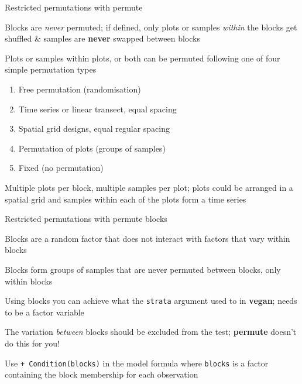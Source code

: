 \documentclass[10pt,ignorenonframetext,compress, aspectratio=169]{beamer}
\providecommand{\tightlist}{%
  \setlength{\itemsep}{0pt}\setlength{\parskip}{0pt}}
\begin{document}
\begin{frame}{Restricted permutations with permute}

Blocks are \emph{never} permuted; if defined, only plots or samples
\emph{within} the blocks get shuffled \& samples are \textbf{never}
swapped between blocks

Plots or samples within plots, or both can be permuted following one of
four simple permutation types

\begin{enumerate}
\def\labelenumi{\arabic{enumi}.}
\tightlist
\item
  Free permutation (randomisation)
\item
  Time series or linear transect, equal spacing
\item
  Spatial grid designs, equal regular spacing
\item
  Permutation of plots (groups of samples)
\item
  Fixed (no permutation)
\end{enumerate}

Multiple plots per block, multiple samples per plot; plots could be
arranged in a spatial grid and samples within each of the plots form a
time series

\end{frame}

\begin{frame}[fragile]{Restricted permutations with permute \textbar{}
blocks}

Blocks are a random factor that does not interact with factors that vary
within blocks

Blocks form groups of samples that are never permuted between blocks,
only within blocks

Using blocks you can achieve what the \texttt{strata} argument used to
in \textbf{vegan}; needs to be a factor variable

The variation \emph{between} blocks should be excluded from the test;
\textbf{permute} doesn't do this for you!

Use \texttt{+\ Condition(blocks)} in the model formula where
\texttt{blocks} is a factor containing the block membership for each
observation

\end{frame}
\end{document}
